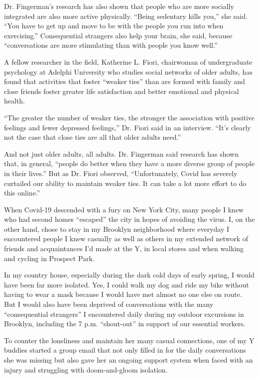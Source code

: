 Dr. Fingerman's research has also shown that people who are more
socially integrated are also more active physically. ``Being sedentary
kills you,'' she said. ``You have to get up and move to be with the
people you run into when exercising.'' Consequential strangers also help
your brain, she said, because ``conversations are more stimulating than
with people you know well.''

A fellow researcher in the field, Katherine L. Fiori, chairwoman of
undergraduate psychology at Adelphi University who studies social
networks of older adults, has found that activities that foster ``weaker
ties'' than are formed with family and close friends foster greater life
satisfaction and better emotional and physical health.

``The greater the number of weaker ties, the stronger the association
with positive feelings and fewer depressed feelings,'' Dr. Fiori said in
an interview. ``It's clearly not the case that close ties are all that
older adults need.''

And not just older adults, all adults. Dr. Fingerman said research has
shown that, in general, ``people do better when they have a more diverse
group of people in their lives.'' But as Dr. Fiori observed,
``Unfortunately, Covid has severely curtailed our ability to maintain
weaker ties. It can take a lot more effort to do this online.''

When Covid-19 descended with a fury on New York City, many people I knew
who had second homes ``escaped'' the city in hopes of avoiding the
virus. I, on the other hand, chose to stay in my Brooklyn neighborhood
where everyday I encountered people I knew casually as well as others in
my extended network of friends and acquaintances I'd made at the Y, in
local stores and when walking and cycling in Prospect Park.

In my country house, especially during the dark cold days of early
spring, I would have been far more isolated. Yes, I could walk my dog
and ride my bike without having to wear a mask because I would have met
almost no one else on route. But I would also have been deprived of
conversations with the many ``consequential strangers'' I encountered
daily during my outdoor excursions in Brooklyn, including the 7 p.m.
``shout-out'' in support of our essential workers.

To counter the loneliness and maintain her many casual connections, one
of my Y buddies started a group email that not only filled in for the
daily conversations she was missing but also gave her an ongoing support
system when faced with an injury and struggling with doom-and-gloom
isolation.

